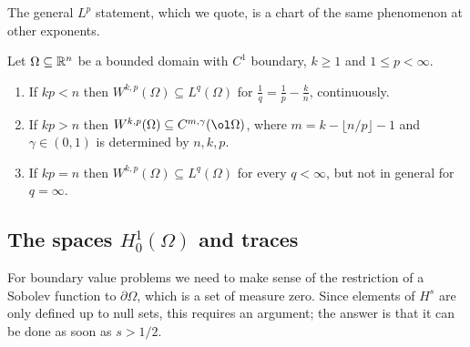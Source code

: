 \documentclass[a4paper]{scrartcl}
\begin{document}
The general $L^p$ statement, which we quote, is a chart of the same phenomenon at other exponents.

\begin{theorem}\label{thm:sobolevchart}
	Let $\Omega\subseteq\mathbb{R}^n$ be a bounded domain with $C^1$ boundary, $k\ge1$ and $1\le p<\infty$.
	\begin{enumerate}[label=(\roman*)]
		\item If $kp<n$ then $W^{k,p}(\Omega)\subseteq L^q(\Omega)$ for $\frac1q=\frac1p-\frac kn$, continuously.
		\item If $kp>n$ then $W^{k,p}(\Omega)\subseteq C^{m,\gamma}(\ol\Omega)$, where $m=k-\lfloor n/p\rfloor-1$ and $\gamma\in(0,1)$ is determined by $n,k,p$.
		\item If $kp=n$ then $W^{k,p}(\Omega)\subseteq L^q(\Omega)$ for every $q<\infty$, but not in general for $q=\infty$.
	\end{enumerate}
\end{theorem}

\begin{center}
\end{center}

\subsection{The spaces \texorpdfstring{$H_0^1(\Omega)$}{H10} and traces}

For boundary value problems we need to make sense of the restriction of a Sobolev function to $\partial\Omega$, which is a set of measure zero. Since elements of $H^s$ are only defined up to null sets, this requires an argument; the answer is that it can be done as soon as $s>1/2$.
\end{document}
